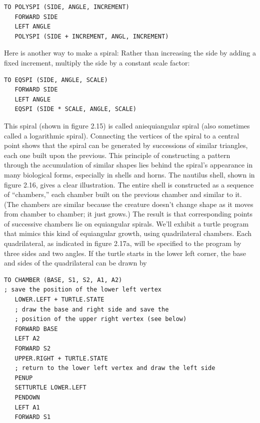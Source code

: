 \documentclass{book}
\begin{document}
\begin{verbatim}
TO POLYSPI (SIDE, ANGLE, INCREMENT)
   FORWARD SIDE
   LEFT ANGLE
   POLYSPI (SIDE + INCREMENT, ANGL, INCREMENT)
\end{verbatim}
Here is another way to make a spiral: Rather than increasing the side by
adding a fixed increment, multiply the side by a constant scale factor:

\begin{verbatim}
TO EQSPI (SIDE, ANGLE, SCALE)
   FORWARD SIDE
   LEFT ANGLE
   EQSPI (SIDE * SCALE, ANGLE, SCALE)
\end{verbatim}
This spiral (shown in figure 2.15) is called aniequiangular spiral (also
sometimes called a logarithmic spiral). Connecting the vertices of the
spiral to a central point shows that the spiral can be generated by 
successions of similar triangles, each one built upon the previous. This
principle of constructing a pattern through the accumulation of similar
shapes lies behind the spiral's appearance in many biological forms,
especially in shells and horns. The nautilus shell, shown in figure 2.16,
gives a clear illustration. The entire shell is constructed as a sequence of
``chambers,'' each chamber built on the previous chamber and similar to
it. (The chambers are similar because the creature doesn't change shape
as it moves from chamber to chamber; it just grows.) The result is that
corresponding points of successive chambers lie on equiangular spirals.
We'll exhibit a turtle program that mimics this kind of equiangular
growth, using quadrilateral chambers. Each quadrilateral, as indicated
in figure 2.17a, will be specified to the program by three sides and two
angles. If the turtle starts in the lower left corner, the base and sides of
the quadrilateral can be drawn by

\begin{verbatim}
TO CHAMBER (BASE, S1, S2, A1, A2)
; save the position of the lower left vertex
   LOWER.LEFT + TURTLE.STATE
   ; draw the base and right side and save the
   ; position of the upper right vertex (see below)
   FORWARD BASE
   LEFT A2
   FORWARD S2
   UPPER.RIGHT + TURTLE.STATE
   ; return to the lower left vertex and draw the left side
   PENUP
   SETTURTLE LOWER.LEFT
   PENDOWN
   LEFT A1
   FORWARD S1
\end{verbatim}
\end{document}
